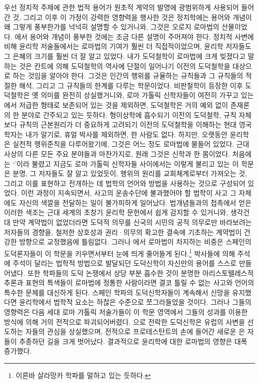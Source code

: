 우선
정치적 주제에 관한 법적 용어가
원초적 계약의 발명에
광범위하게 사용되어 들어간 것, 그리고
이후 이 가정이 강력한 영향력을 행사한 것은
정치학에는
용어와 개념이
왜 그렇게 풍부한가를 넉넉히 설명할 수 있거니와,
그것은 오로지 로마법의 산물이었다.
에서 용어와 개념이 풍부한 것에는
조금 다른 설명이 주어져야 한다.
정치적 사변에 비해
윤리학 저술들에서는 로마법의 기여가
훨씬 더 직접적이었으며,
윤리학 저자들도
그 은혜의 크기를 훨씬 더 잘 알고 있었다.
내가 도덕철학이 로마법에 크게 빚졌다고 말하는 것은
칸트에 의해 도덕철학의 역사에 단절이 일어나기 이전의
도덕철학을 대상으로 하는 것임을 알아야 한다.
그것은 인간의 행위를 규율하는 규칙들과
그 규칙들의 적절한 해석,
그리고 그 규칙들의 한계를
다루는 학문이었다.
비판철학이 등장한 이후
도덕철학은 옛 의미를 완전히 상실했거니와,
로마 가톨릭 신학자들이 여전히 가꾸고 있는
에서
저급한 형태로 보존되어 있는 것을 제외하면,
도덕철학은 거의 예외 없이 존재론의 한 분야로 간주되고 있는 듯하다.
형이상학에 흡수되기 이전의 도덕철학,
규칙 자체보다 규칙의 근본원리가 더 중요하게 고려되기 이전의 도덕철학을
이해하는
현대 영국 학자는
내가 알기로,
휴얼 박사를 제외하면,
한 사람도 없다.
하지만,
오랫동안
윤리학은
실천적 행위준칙을 다루어왔기에,
그것은 어느 정도 로마법에 물들어 있었다.
근대 사상의 다른 모든 주요 분야들과 마찬가지로,
원래
그것은
신학과 한 몸이었다.
처음에는 `'이라 불렸고
지금도 로마 가톨릭 신학자들 사이에서는 이렇게 불리고 있는
이 학문은 분명, 그 저자들도 잘 알고 있었듯이,
행위의 원리를
교회체계로부터
가져오는 것, 그리고
이를 표현하고 전개하는 데 법학의 언어와 방법을 사용하는 것으로
구성되어 있었다.
이런 과정이 지속되면서,
사고의 운송수단에 불과했어야 할 법학이
사고 그 자체에도 자신의 색깔을 전달하는 일이 불가피하게 일어났다.
법개념들과의 접촉에서 얻은 이러한 색조는
근대 세계의 초창기 윤리학 문헌에서 쉽게 감지할 수 있거니와,
생각건대
만약 계약법이 없었더라면
도덕적 의무를
신국의 시민의 공적 의무로만
바라보려는
저자들의
경향을,
철저한 상호성과 권리^^b7의무의 확고한 결속에 기초하는 계약법이
건강한 방향으로 교정했음에
틀림없다.
그러나 에서 로마법이 차지하는 비중은
스페인의 도덕론자들이 이 학문을 키우면서부터
눈에 띄게 줄어들게 된다.\footnote{%
  이른바 살라망카 학파를 말하고 있는 듯하다.
  }
박사들에 의해 주석에 주석이 달리는 법학적 방법으로 발달되던
도덕신학이 자신만의 용어를 스스로 만들어냈다.
또한
학파들의 도덕 논쟁에서 상당 부분 흡수한 것이 분명한
아리스토텔레스적 추론과 표현의 특색들이
로마법에 정통한 사람이라면 결코 틀릴 수 없는
사고와 언어의 특수한 문체를 대신하게 된다.
스페인 학파의 도덕신학자들이 계속해서 신망을 유지했다면
윤리학에서 법학적 요소는 하찮은 수준으로 쪼그라들었을 것이다.
그러나
그들의 영향력은
다음 세대 로마 가톨릭 저술가들이
이 학문 영역에서
그들의 성과를 이용한 방식에 의해
거의 전적으로 파괴되어버렸다.
으로 전락한
도덕신학은
유럽의 사변을 선도하는 자들의
관심을 상실했으며,
전적으로 프로테스탄트의 손에 들어간
새로운 은
자들이 추종하던 길을 크게 벗어났다.
결과적으로 윤리학에 대한 로마법의 영향은 대폭 증가했다.

